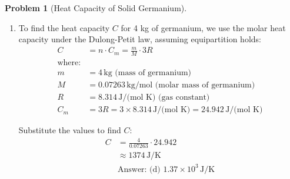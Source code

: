 \documentclass[12pt]{article}
\theoremstyle{definition} %
\newtheorem{problem}{Problem}
\theoremstyle{plain} %
\begin{document}
\begin{problem}[Heat Capacity of Solid Germanium]
    \noindent
    \begin{enumerate}
        \item 
        To find the heat capacity \( C \) for 4 kg of germanium, we use the molar heat capacity under the Dulong-Petit law, assuming equipartition holds:
        \begin{align*}
        C &= n \cdot C_m = \frac{m}{M} \cdot 3R \\
        \text{where:} \\
        m &= 4 \, \text{kg (mass of germanium)} \\
        M &= 0.07263 \, \text{kg/mol (molar mass of germanium)} \\
        R &= 8.314 \, \text{J/(mol K) (gas constant)} \\
        C_m &= 3R = 3 \times 8.314 \, \text{J/(mol K)} = 24.942 \, \text{J/(mol K)}
        \end{align*}

        Substitute the values to find \( C \):
        \begin{align*}
        C &= \frac{4}{0.07263} \cdot 24.942 \\
        &\approx 1374 \, \text{J/K} \\
        &\text{Answer: (d) } 1.37 \times 10^3 \, \text{J/K}
        \end{align*}
    \end{enumerate}
\end{problem}
\end{document}
